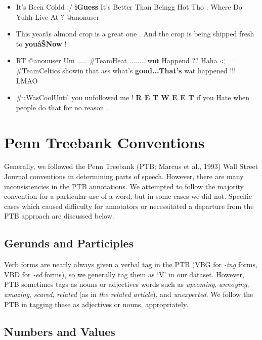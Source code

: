 \documentclass[11pt,letterpaper]{article}
\begin{document}
\begin{itemize}
\item[] It's Been Coldd :/ \textbf{iGuess} It's Better Than Beingg Hot Tho . Where Do Yuhh Live At ? @anonuser
\item[] This year\^{a}s almond crop is a great one . And the crop is being shipped fresh to \textbf{you\^{a}\v{S}Now} !
\item[] RT @anonuser Um ..... \#TeamHeat ........ wut Happend ?? Haha \textless == \#TeamCeltics showin that ass what's \textbf{good...That's} wat happened !!! LMAO
\item[] \#uWasCoolUntil you unfollowed me ! \textbf{R E T W E E T} if you Hate when people do that for no reason .
\end{itemize}


\section{Penn Treebank Conventions}

Generally, we followed the Penn Treebank (PTB; Marcus et al., 1993)\nocite{marcus-93b} Wall Street Journal conventions in determining parts of speech. 
However, there are many inconsistencies in the PTB annotations. We attempted to follow the majority convention for a particular use of a word, but in some cases we did not. 
Specific cases which caused difficulty for annotators or necessitated a departure from the PTB 
approach are discussed below.

\subsection{Gerunds and Participles}

Verb forms are nearly always given a verbal tag in the PTB (VBG for \emph{-ing} forms, VBD for \emph{-ed} forms), so we generally tag them as `V' in our dataset. 
However, PTB sometimes tags as nouns or adjectives words such as \emph{upcoming}, \emph{annoying}, \emph{amazing}, \emph{scared}, \emph{related} (as in \emph{the related article}), and \emph{unexpected}. 
We follow the PTB in tagging these as adjectives or nouns, appropriately.

\subsection{Numbers and Values}
\end{document}
